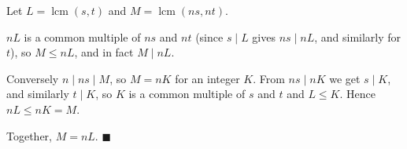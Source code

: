 Let $L=\operatorname{lcm}(s,t)$ and $M=\operatorname{lcm}(ns,nt)$.

$nL$ is a common multiple of $ns$ and $nt$ (since $s\mid L$ gives $ns\mid nL$, and similarly for $t$), so $M\le nL$, and in fact $M\mid nL$.

Conversely $n\mid ns\mid M$, so $M=nK$ for an integer $K$. From $ns\mid nK$ we get $s\mid K$, and similarly $t\mid K$, so $K$ is a common multiple of $s$ and $t$ and $L\le K$. Hence $nL\le nK=M$.

Together, $M=nL$. $\blacksquare$
